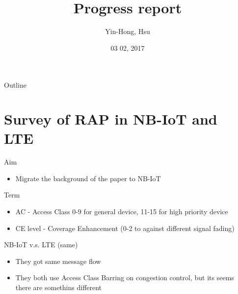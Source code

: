 \documentclass{beamer}
\title {
    Progress report
}
\author {
    Yin-Hong, Hsu
}
\date {
    03 02, 2017
}
\begin{document}
\begin{frame}
    \titlepage
\end{frame}


\begin{frame}{Outline}
    \tableofcontentsgather
    \tableofcontents
\end{frame}


\section{Survey of RAP in NB-IoT and LTE}

\begin{frame}{Aim}
    \begin{itemize}
        \item {Migrate the background of the paper to NB-IoT}
    \end{itemize}
\end{frame}

\begin{frame}{Term}
    \begin{itemize}
        \item {AC - Access Class 0-9 for general device, 11-15 for high priority device}
        \item {CE level - Coverage Enhancement (0-2 to against different signal fading)}
    \end{itemize}
\end{frame}

\begin{frame}{NB-IoT v.s. LTE (same)}
    \begin{itemize}
        \item {They got same message flow}
        \item {They both use Access Class Barring on congestion control, but its seems there are somethins different}
    \end{itemize}
\end{frame}
\end{document}
